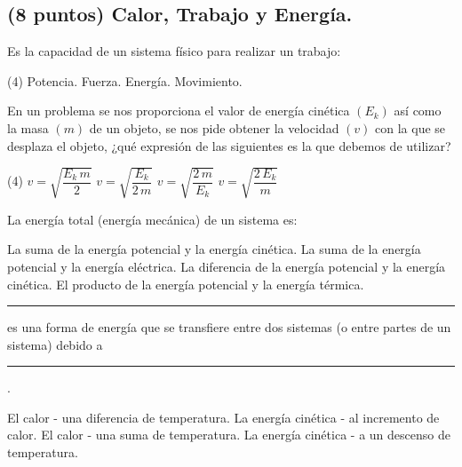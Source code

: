 \documentclass[12pt, letter]{exam}
\begin{document}
\begin{questions}
    \section{(8 puntos) Calor, Trabajo y Energía.}
    
    \question Es la capacidad de un sistema físico para realizar un trabajo:
    \begin{tasks}(4)
        \task Potencia.
        \task Fuerza.
        \task Energía.
        \task Movimiento.
    \end{tasks}
    \question En un problema se nos proporciona el valor de energía cinética $(E_{k})$ así como la masa $(m)$ de un objeto, se nos pide obtener la velocidad $(v)$ con la que se desplaza el objeto, ¿qué expresión de las siguientes es la que debemos de utilizar?
    \begin{tasks}(4)
        \task $v = \sqrt{\dfrac{E_{k} \, m}{2}}$
        \task $v = \sqrt{\dfrac{E_{k}}{2 \, m}}$
        \task $v = \sqrt{\dfrac{2 \, m}{E_{k}}}$
        \task $v = \sqrt{\dfrac{2 \, E_{k}}{m}}$
    \end{tasks}
    \question La energía total (energía mecánica) de un sistema es:
    \begin{tasks}
        \task La suma de la energía potencial y la energía cinética.
        \task La suma de la energía potencial y la energía eléctrica.
        \task La diferencia de la energía potencial y la energía cinética.
        \task El producto de la energía potencial y la energía térmica.
    \end{tasks}
    \question \rule{2cm}{0.1mm} es una forma de energía que se transfiere entre dos sistemas (o entre partes de un sistema) debido a \rule{2cm}{0.1mm}.
    \begin{tasks}
        \task El calor - una diferencia de temperatura.
        \task La energía cinética - al incremento de calor.
        \task El calor - una suma de temperatura.
        \task La energía cinética - a un descenso de temperatura.
    \end{tasks}
    

\end{questions}
\end{document}
